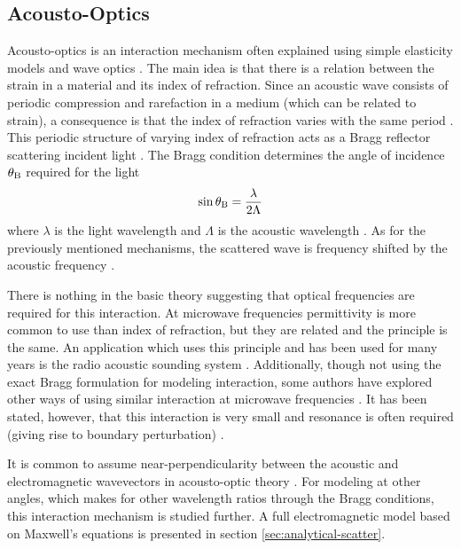 \documentclass[11pt,twoside]{eitExjobb}
\begin{document}
	\subsection{Acousto-Optics}
	Acousto-optics is an interaction mechanism often explained using simple elasticity models and wave optics \cite{Saleh2007}\cite{Korpel1981}. The main idea is that there is a relation between the strain in a material and its index of refraction. Since an acoustic wave consists of periodic compression and rarefaction in a medium (which can be related to strain), a consequence is that the index of refraction varies with the same period \cite{Saleh2007}. This periodic structure of varying index of refraction acts as a Bragg reflector scattering incident light \cite{Saleh2007}. The Bragg condition determines the angle of incidence $\theta_{\mathrm{B}}$ required for the light
	\begin{equation*}
		\sin{\theta_{\mathrm{B}}} = \frac{\lambda}{2\Lambda}
	\end{equation*}
	where $\lambda$ is the light wavelength and $\Lambda$ is the acoustic wavelength \cite{Saleh2007}. As for the previously mentioned mechanisms, the scattered wave is frequency shifted by the acoustic frequency \cite{Korpel1988}.
	
	There is nothing in the basic theory suggesting that optical frequencies are required for this interaction. At microwave frequencies permittivity is more common to use than index of refraction, but they are related and the principle is the same. An application which uses this principle and has been used for many years is the radio acoustic sounding system \cite{Buerkle2007}. Additionally, though not using the exact Bragg formulation for modeling interaction, some authors have explored other ways of using similar interaction at microwave frequencies \cite{Lawrence2001}\cite{Merkel2006}. It has been stated, however, that this interaction is very small and resonance is often required (giving rise to boundary perturbation) \cite{Buerkle2007}.
	
	It is common to assume near-perpendicularity between the acoustic and electromagnetic wavevectors in acousto-optic theory \cite{Korpel1988}. For modeling at other angles, which makes for other wavelength ratios through the Bragg conditions, this interaction mechanism is studied further. A full electromagnetic model based on Maxwell's equations is presented in section \ref{sec:analytical-scatter}.
	
\end{document}
